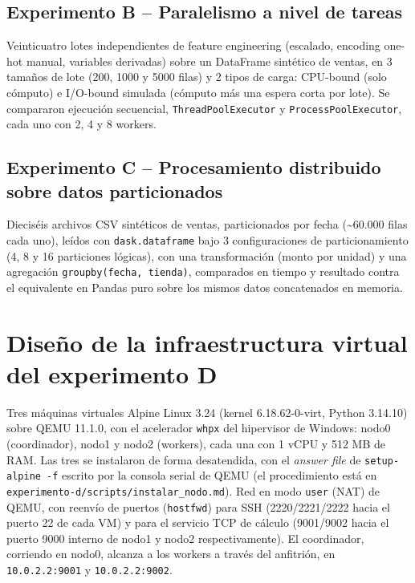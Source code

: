 \documentclass[11pt]{article}
\begin{document}
\subsection{Experimento B -- Paralelismo a nivel de tareas}

Veinticuatro lotes independientes de feature engineering (escalado,
encoding one-hot manual, variables derivadas) sobre un DataFrame sintético
de ventas, en 3 tamaños de lote (200, 1000 y 5000 filas) y 2 tipos de carga:
CPU-bound (solo cómputo) e I/O-bound simulada (cómputo más una espera corta
por lote). Se compararon ejecución secuencial, \texttt{ThreadPoolExecutor} y
\texttt{ProcessPoolExecutor}, cada uno con 2, 4 y 8 workers.

\subsection{Experimento C -- Procesamiento distribuido sobre datos particionados}

Dieciséis archivos CSV sintéticos de ventas, particionados por fecha
(\textasciitilde60.000 filas cada uno), leídos con \texttt{dask.dataframe}
bajo 3 configuraciones de particionamiento (4, 8 y 16 particiones lógicas),
con una transformación (monto por unidad) y una agregación
\texttt{groupby(fecha, tienda)}, comparados en tiempo y resultado contra el
equivalente en Pandas puro sobre los mismos datos concatenados en memoria.

\section{Diseño de la infraestructura virtual del experimento D}

Tres máquinas virtuales Alpine Linux 3.24 (kernel 6.18.62-0-virt, Python
3.14.10) sobre QEMU 11.1.0, con el acelerador \texttt{whpx} del hipervisor de
Windows: nodo0 (coordinador), nodo1 y nodo2 (workers), cada una con 1 vCPU y
512 MB de RAM. Las tres se instalaron de forma desatendida, con el
\emph{answer file} de \texttt{setup-alpine -f} escrito por la consola serial de
QEMU (el procedimiento está en \texttt{experimento-d/scripts/instalar\_nodo.md}).
Red en modo \texttt{user} (NAT) de QEMU, con reenvío de puertos
(\texttt{hostfwd}) para SSH (2220/2221/2222 hacia el puerto 22 de cada VM) y
para el servicio TCP de cálculo (9001/9002 hacia el puerto 9000 interno de
nodo1 y nodo2 respectivamente). El coordinador, corriendo en nodo0, alcanza
a los workers a través del anfitrión, en \texttt{10.0.2.2:9001} y
\texttt{10.0.2.2:9002}.
\end{document}
